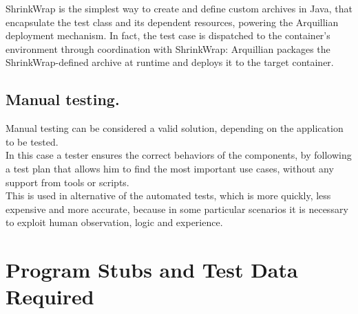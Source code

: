 \documentclass[18pt,oneside,a4paper, titlepage]{article}
\begin{document}
			
		\vspace{0.5cm}
			
		ShrinkWrap is the simplest way to create and define custom archives in Java, that encapsulate the test class and its dependent resources, powering the Arquillian deployment mechanism. In fact, the test case is dispatched to the container's environment through coordination with ShrinkWrap: Arquillian packages the ShrinkWrap-defined archive at runtime and deploys it to the target container.
		
	\subsection{Manual testing.}
		Manual testing can be considered a valid solution, depending on the application to be tested.\\ In this case a tester ensures the correct behaviors of the components, by following a test plan that allows him to find the most important use cases, without any support from tools or scripts.\\ This is used in alternative of the automated tests, which is more quickly, less expensive and more accurate, because in some particular scenarios it is necessary to exploit human observation, logic and experience.

\newpage
\section{Program	Stubs	and	Test	Data	Required}
\end{document}
